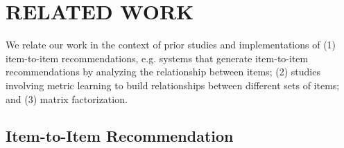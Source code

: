 

\chapter{RELATED WORK} 

We relate our work in the context of prior studies and implementations of (1) item-to-item recommendations, e.g. systems that generate item-to-item recommendations by analyzing the relationship between items; (2) studies involving metric learning to build relationships between different sets of items; and (3) matrix factorization.

\section{Item-to-Item Recommendation}

